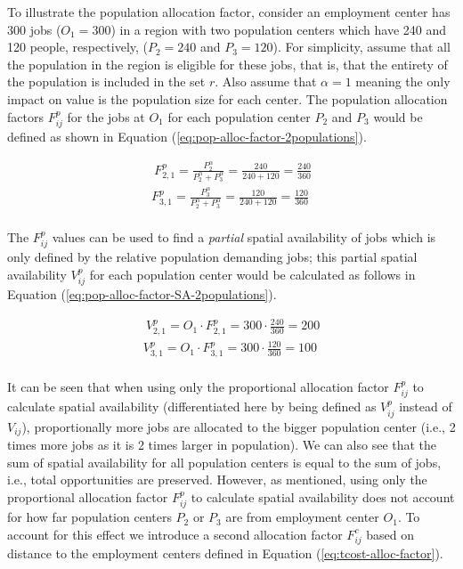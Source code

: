 \documentclass[]{elsarticle} %
\begin{document}
To illustrate the population allocation factor, consider an employment
center has 300 jobs (\(O_1= 300\)) in a region with two population
centers which have 240 and 120 people, respectively, (\(P_2= 240\) and
\(P_3 = 120\)). For simplicity, assume that all the population in the
region is eligible for these jobs, that is, that the entirety of the
population is included in the set \(r\). Also assume that \(\alpha=1\)
meaning the only impact on value is the population size for each center.
The population allocation factors \(F^p_{ij}\) for the jobs at \(O_1\)
for each population center \(P_2\) and \(P_3\) would be defined as shown
in Equation (\ref{eq:pop-alloc-factor-2populations}).

\begin{equation}
\label{eq:pop-alloc-factor-2populations}
\begin{array}{l}\
F^p_{2,1} = \frac{P_2 ^\alpha}{P_2^\alpha + P_3^\alpha} = \frac{240}{240 + 120} = \frac{240}{360}\\
F^p_{3,1} = \frac{P_3^\alpha}{P_2^\alpha + P_3^\alpha}  = \frac{120}{240 + 120} = \frac{120}{360}\\
\end{array}
\end{equation}

The \(F^p_{ij}\) values can be used to find a \emph{partial} spatial
availability of jobs which is only defined by the relative population
demanding jobs; this partial spatial availability \(V^p_{ij}\) for each
population center would be calculated as follows in Equation
(\ref{eq:pop-alloc-factor-SA-2populations}).

\begin{equation}
\label{eq:pop-alloc-factor-SA-2populations}
\begin{array}{l}\
V^p_{2,1} = O_1 \cdot F^p_{2,1} = 300 \cdot \frac{240}{360} = 200 \\
V^p_{3,1} = O_1 \cdot F^p_{3,1} = 300 \cdot \frac{120}{360} = 100 \\
\end{array}
\end{equation}

It can be seen that when using only the proportional allocation factor
\(F^p_{ij}\) to calculate spatial availability (differentiated here by
being defined as \(V^p_{ij}\) instead of \(V_{ij}\)), proportionally
more jobs are allocated to the bigger population center (i.e., 2 times
more jobs as it is 2 times larger in population). We can also see that
the sum of spatial availability for all population centers is equal to
the sum of jobs, i.e., total opportunities are preserved. However, as
mentioned, using only the proportional allocation factor \(F^p_{ij}\) to
calculate spatial availability does not account for how far population
centers \(P_2\) or \(P_3\) are from employment center \(O_1\). To
account for this effect we introduce a second allocation factor
\(F^c_{ij}\) based on distance to the employment centers defined in
Equation (\ref{eq:tcost-alloc-factor}).
\end{document}

